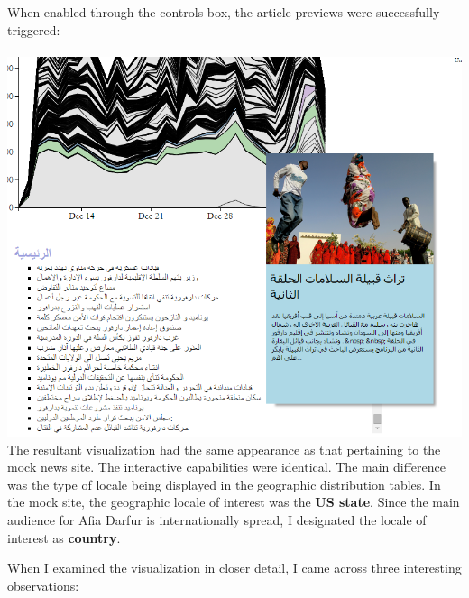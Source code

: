 \documentclass[12pt]{article}
\begin{document}
{\newpage

\noindent When enabled through the controls box, the article previews were successfully triggered: \\ \\  
\noindent\includegraphics[scale=0.5]{img/afiadarfur_hover} \\

The resultant visualization had the same appearance as that pertaining to the mock news site. The interactive capabilities were identical. The main difference was the type of locale being displayed in the geographic distribution tables. In the mock site, the geographic locale of interest was the \textbf{US state}. Since the main audience for Afia Darfur is internationally spread, I designated the locale of interest as \textbf{country}.

\newpage

When I examined the visualization in closer detail, I came across three interesting observations:

}
\end{document}
